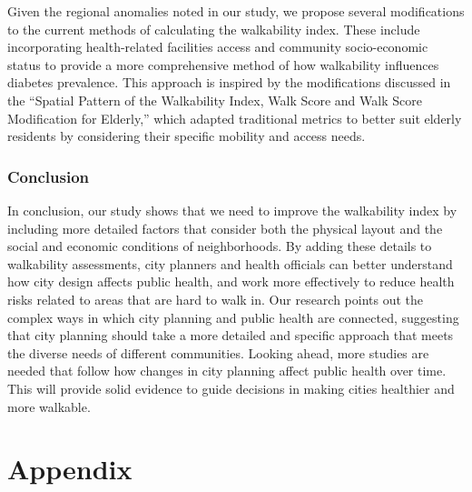 \documentclass[
]{article}
\begin{document}
Given the regional anomalies noted in our study, we propose several
modifications to the current methods of calculating the walkability
index. These include incorporating health-related facilities access and
community socio-economic status to provide a more comprehensive method
of how walkability influences diabetes prevalence. This approach is
inspired by the modifications discussed in the ``Spatial Pattern of the
Walkability Index, Walk Score and Walk Score Modification for Elderly,''
which adapted traditional metrics to better suit elderly residents by
considering their specific mobility and access needs.

\subsubsection{Conclusion}\label{conclusion}

In conclusion, our study shows that we need to improve the walkability
index by including more detailed factors that consider both the physical
layout and the social and economic conditions of neighborhoods. By
adding these details to walkability assessments, city planners and
health officials can better understand how city design affects public
health, and work more effectively to reduce health risks related to
areas that are hard to walk in. Our research points out the complex ways
in which city planning and public health are connected, suggesting that
city planning should take a more detailed and specific approach that
meets the diverse needs of different communities. Looking ahead, more
studies are needed that follow how changes in city planning affect
public health over time. This will provide solid evidence to guide
decisions in making cities healthier and more walkable.

\newpage{}

\section{Appendix}\label{appendix}
\end{document}
